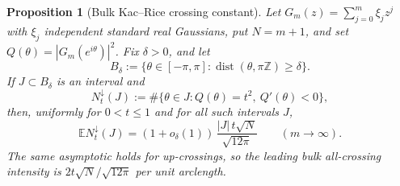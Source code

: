 \documentclass[11pt]{amsart}
\numberwithin{equation}{section}
\newtheorem{proposition}[theorem]{Proposition}
\theoremstyle{definition}
\theoremstyle{remark}
\newcommand{\Exp}{\mathbb E}
\newcommand{\dist}{\operatorname{dist}}
\begin{document}
\begin{proposition}[Bulk Kac--Rice crossing constant]\label{prop:bulk-kr-constant}
Let \(G_m(z)=\sum_{j=0}^m\xi_jz^j\) with \(\xi_j\) independent standard real
Gaussians, put \(N=m+1\), and set \(Q(\theta)=|G_m(e^{i\theta})|^2\).  Fix
\(\delta>0\), and let
\[
  B_\delta:=\{\theta\in[-\pi,\pi]:\dist(\theta,\pi\mathbb Z)\ge\delta\}.
\]
If \(J\subset B_\delta\) is an interval and
\[
  N_t^\downarrow(J):=
  \#\{\theta\in J:Q(\theta)=t^2,\ Q'(\theta)<0\},
\]
then, uniformly for \(0<t\le1\) and for all such intervals \(J\),
\begin{equation}\label{eq:bulk-kr-constant}
  \Exp N_t^\downarrow(J)
  =
  (1+o_\delta(1))\,\frac{|J|\,t\sqrt N}{\sqrt{12\pi}}
  \qquad(m\to\infty).
\end{equation}
The same asymptotic holds for up-crossings, so the leading bulk all-crossing
intensity is \(2t\sqrt N/\sqrt{12\pi}\) per unit arclength.
\end{proposition}
\end{document}
